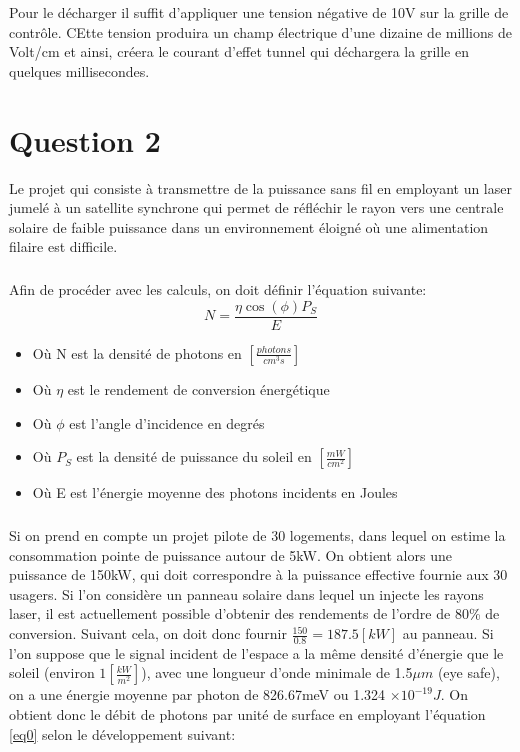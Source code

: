 Pour le décharger il suffit d'appliquer une tension négative de 10V sur la grille de contrôle. CEtte tension produira un champ électrique d'une dizaine de millions de Volt/cm et ainsi, créera le courant d'effet tunnel qui déchargera la grille en quelques millisecondes.
\chapter*{Question 2}

Le projet qui consiste à transmettre de la puissance sans fil en employant un laser jumelé à un satellite synchrone qui permet de réfléchir le rayon vers une centrale solaire de faible puissance dans un environnement éloigné où une alimentation filaire est difficile. 

\paragraph*{}Afin de procéder avec les calculs, on doit définir l'équation suivante:
\begin{equation}
\label{eq0}
N = \frac{\eta \cos(\phi)P_S}{E} 
\end{equation}
\begin{itemize}
\item Où N est la densité de photons en $\left[\frac{photons}{cm^3 s }\right]$
\item Où $\eta$ est le rendement de conversion énergétique
\item Où $\phi$ est l'angle d'incidence en degrés
\item Où $P_S$ est la densité de puissance du soleil en $\left[\frac{mW}{cm^2}\right]$
\item Où E est l'énergie moyenne des photons incidents en Joules
\end{itemize}

\paragraph{}Si on prend en compte un projet pilote de 30 logements, dans lequel on estime la consommation pointe de puissance autour de 5kW. On obtient alors une puissance de 150kW, qui doit correspondre à la puissance effective fournie aux 30 usagers. Si l'on considère un panneau solaire dans lequel un injecte les rayons laser, il est actuellement possible d'obtenir des rendements de l'ordre de 80\% de conversion. Suivant cela, on doit donc fournir $\frac{150}{0.8} = 187.5 \left[kW\right]$ au panneau. Si l'on suppose que le signal incident de l'espace a la même densité d'énergie que le soleil (environ $1\left[\frac{kW}{m^2}\right]$), avec une longueur d'onde minimale de 1.5$\mu m$ (eye safe), on a une énergie moyenne par photon de 826.67meV ou 1.324 $\times 10^{-19} J$. On obtient donc le débit de photons par unité de surface en employant l'équation \ref{eq0} selon le développement suivant:

